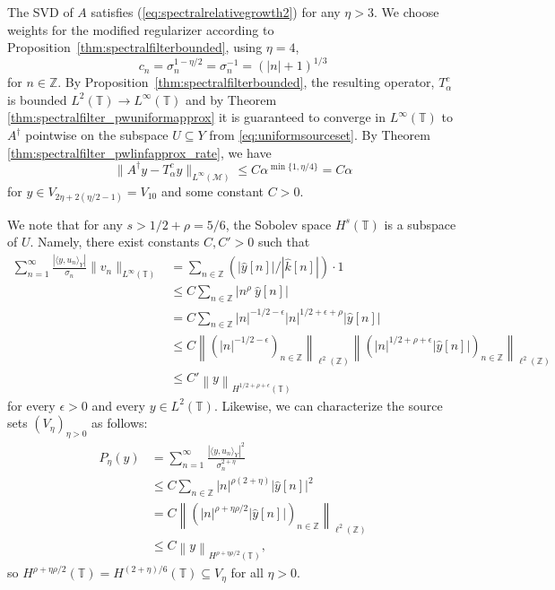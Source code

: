 \documentclass{article}
\theoremstyle{definition}
\newcommand{\Z}{\mathbb{Z}}
\newcommand{\T}{\mathbb{T}}
\newcommand{\smallnorm}[1]{\lVert#1\rVert}
\newcommand{\norm}[1]{\left\lVert#1\right\rVert}
\newcommand{\abs}[1]{\left\lvert#1\right\rvert}
\newcommand{\fhat}[1]{\widehat{#1}}
\newcommand{\pseudoinv}[1]{{#1}^\dagger}
\begin{document}
The SVD of \(A\) satisfies (\ref{eq:spectralrelativegrowth2})
for any \(\eta > 3\).
We choose weights for the modified regularizer 
according to Proposition~\ref{thm:spectralfilterbounded},
using \(\eta=4\),
\begin{equation*}
    c_n = \sigma_n^{1-
    \eta/2}
    =
    \sigma_n^{-1}
    =
    (\abs{n}+1)^{1/3}
\end{equation*}
for \(n\in\Z\).
By Proposition~\ref{thm:spectralfilterbounded},
the resulting operator, \(T^{c}_\alpha\)
is bounded
\(L^2(\T)\to L^\infty(\T)\)
and by Theorem \ref{thm:spectralfilter_pwuniformapprox} it is guaranteed to converge in \(L^\infty(\T)\) to \(\pseudoinv{A}\) pointwise on the subspace \(U\subseteq Y\) from \eqref{eq:uniformsourceset}.
By Theorem \ref{thm:spectralfilter_pwlinfapprox_rate},
we have
\begin{equation*}
    \smallnorm{\pseudoinv{A} y - T^c_\alpha y}_{L^\infty(\mathcal{M})}
        \leq 
        C \alpha^{\min\{1,\eta/4\}}
        =
        C \alpha
\end{equation*}
for
\(y\in V_{2\eta + 2(\eta/2-1)} = V_{10}\)
and some constant \(C>0\).

We note that 
for any 
\(s>1/2+\rho=5/6\),
the Sobolev space \(H^s(\T)\) is a subspace of \(U\).
Namely,
there exist  constants \(C,C'>0\) such that
\begin{align*}
    \sum_{n=1}^\infty \frac{\abs{\langle y,u_n\rangle_Y}}{\sigma_n}\smallnorm{v_n}_{L^\infty(\T)}
    &
    =
    \sum_{n\in\Z} \left(\abs{\fhat{y}[n]}/\abs{\fhat{k}[n]}\right)\cdot 1\\
    &
    \leq
    C
    \sum_{n\in\Z} \abs{n^\rho\ \fhat{y}[n]}\\
    &
    =
    C
    \sum_{n\in\Z} \abs{n}^{-1/2-\epsilon} \abs{n}^{1/2+\epsilon+\rho} \abs{\fhat{y}[n]}\\
    &
    \leq
    C
    \norm{\left(\abs{n}^{-1/2-\epsilon}\right)_{n\in\Z}}_{\ell^2(\Z)}
    \norm{\left(\abs{n}^{1/2+\rho+\epsilon}\abs{\fhat{y}[n]}\right)_{n\in\Z}}_{\ell^2(\Z)}\\
    &
    \leq
    C'
    \norm{y}_{H^{1/2+\rho+\epsilon}(\T)}
\end{align*}
for every \(\epsilon>0\) and every \(y\in L^2(\T)\).
Likewise, we can characterize the source sets \((V_\eta)_{\eta>0}\) as follows:
\begin{align*}
    P_\eta(y) & = \sum_{n=1}^\infty \frac{\abs{\langle y, u_n\rangle_Y}^2}{\sigma_n^{2+\eta}}\\
    &\leq
    C \sum_{n\in\Z} \abs{n}^{\rho(2+\eta)}\abs{\fhat{y}[n]}^2\\
    &= C\norm{\left(\abs{n}^{\rho+\eta\rho/2}\abs{\fhat{y}[n]}\right)_{n\in\Z}}_{\ell^2(\Z)}\\
    &
    \leq
    C
    \norm{y}_{H^{\rho + \eta\rho/2}(\T)},
\end{align*}
so
\(H^{\rho+\eta\rho/2}(\T)=H^{(2+\eta)/6}(\T)\subseteq V_\eta\) for all \(\eta>0\).
\end{document}
